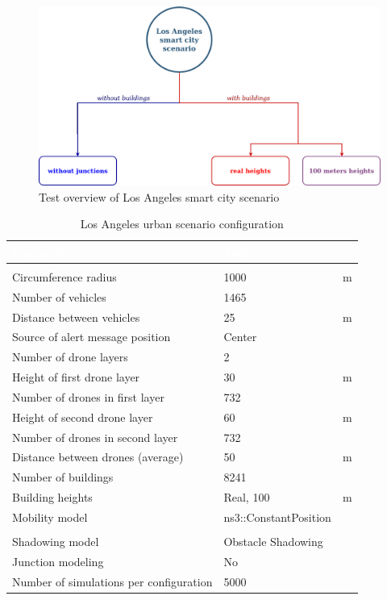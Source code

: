 		\begin{figure}[H]
			\centering
			\includegraphics[width=1.0\textwidth]{immagini/la-smart-city/overview}
			\caption{Test overview of Los Angeles smart city scenario}
			\label{fig:la-smart-city-overview}
		\end{figure}
		
	\begin{table}[H]
		\def\arraystretch{1.1}
		\begin{tabularx}{\textwidth}{l | l  l}
			\rowcolor{I} {\large \textcolor{white}{Parameter}} & {\large \textcolor{white}{Value}} & {\large \textcolor{white}{}} \TBstrut  \\
			\toprule
			\endhead
			\rowcolor{P} \multicolumn{3}{c}{Scenario configuration} \\
			\midrule[1pt]
			Circumference radius					& 1000					& m		\\
			Number of vehicles						& 1465					& 		\\
			Distance between vehicles 				& 25					& m		\\
			Source of alert message position		& Center				&		\\
			Number of drone layers					& 2						&		\\
			Height of first drone layer				& 30					& m		\\
			Number of drones in first layer			& 732					& 		\\
			Height of second drone layer			& 60					& m		\\
			Number of drones in second layer		& 732					& 		\\
			Distance between drones (average)		& 50					& m		\\
			Number of buildings						& 8241					&		\\
			Building heights						& Real, 100				& m		\\
			Mobility model							& ns3::ConstantPosition	&		\\
			\midrule[1pt]
			\rowcolor{P} \multicolumn{3}{c}{Network configuration} \\
			\midrule[1pt]
			Shadowing model							& Obstacle Shadowing 	&		\\
			Junction modeling						& No					&		\\
			\midrule[1pt]
			Number of simulations per configuration	& 5000					&		\\
			\bottomrule
		\end{tabularx}
		\caption{Los Angeles urban scenario configuration}
		\label{tab:la-smart-city}
	\end{table}
	
